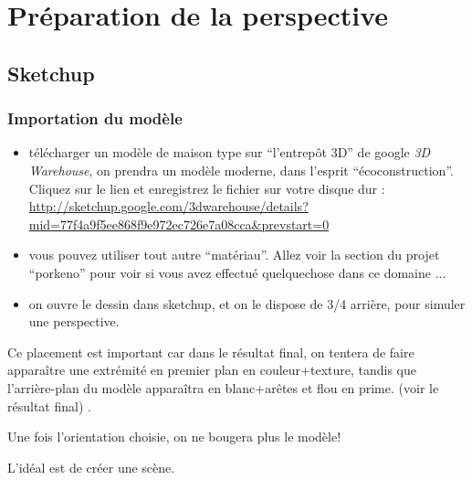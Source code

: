 \documentclass[a4paper,12pt,french]{sphinxmanual}
\begin{document}
\section{Préparation de la perspective}
\label{psd/prepa-image_su+psd:prepa-image-su-psd}\label{psd/prepa-image_su+psd:preparation-de-la-perspective}\label{psd/prepa-image_su+psd::doc}

\subsection{Sketchup}
\label{psd/prepa-image_su+psd:sketchup}

\subsubsection{Importation du modèle}
\label{psd/prepa-image_su+psd:importation-du-modele}
\noindent{}
\begin{itemize}
\item {} 
télécharger un modèle de maison type sur ``l'entrepôt 3D'' de google \emph{3D Warehouse}, on prendra un modèle moderne, dans l'esprit ``écoconstruction''. Cliquez sur le lien et enregistrez le fichier sur votre disque dur : \url{http://sketchup.google.com/3dwarehouse/details?mid=77f4a9f5ee868f9e972ec726e7a08cca\&prevstart=0}

\item {} 
vous pouvez utiliser tout autre ``matériau''. Allez voir la section {\hyperref[init_su+acad/002_demarrage:demarrage\string-init\string-su\string-acad]{}} du projet ``porkeno'' pour voir si vous avez effectué quelquechose dans ce domaine ...

\item {} 
on ouvre le dessin dans sketchup, et on le dispose de 3/4 arrière, pour simuler une perspective.

\end{itemize}

Ce placement est important car dans le résultat final, on tentera de faire apparaître une extrémité en premier plan en couleur+texture, tandis que l'arrière-plan du modèle apparaîtra en blanc+arêtes et flou en prime. (voir le résultat final) .

Une fois l'orientation choisie, on ne bougera plus le modèle!

L'idéal est de créer une scène.
\end{document}
